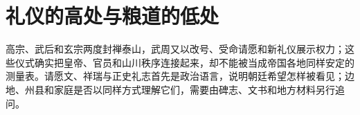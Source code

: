 \section{礼仪的高处与粮道的低处} \label{sec:wu-zhou-ritual-fiscal-urban-order}  高宗、武后和玄宗两度封禅泰山，武周又以改号、受命请愿和新礼仪展示权力；这些仪式确实把皇帝、官员和山川秩序连接起来，却不能被当成帝国各地同样安定的测量表。请愿文、祥瑞与正史礼志首先是政治语言，说明朝廷希望怎样被看见；边地、州县和家庭是否以同样方式理解它们，需要由碑志、文书和地方材料另行追问。%